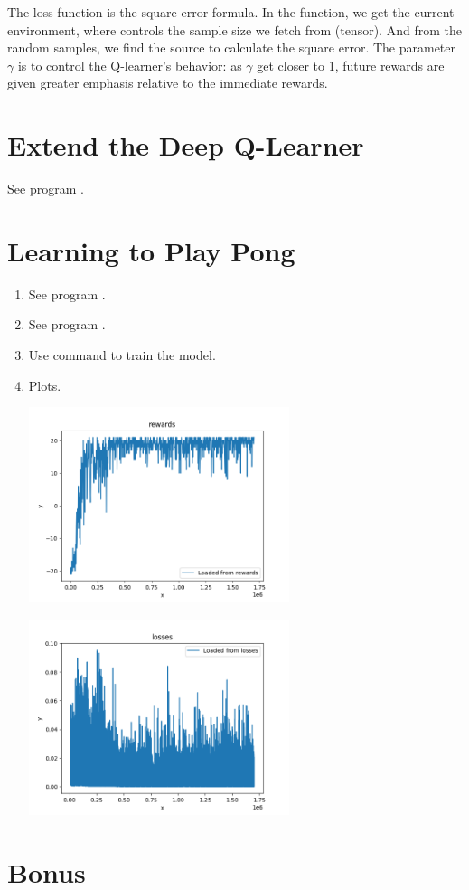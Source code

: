 \documentclass[12pt]{article}
\newcommand{\1}{\mathds{1}}
\newcommand{\<}{\langle}
\renewcommand{\>}{\rangle}
\begin{document}
The loss function is the square error formula.
In the function, we get the current environment,
where  controls the sample size we fetch from  (tensor).
And from the random samples, we find the source to calculate the square error.
The parameter $\gamma$ is to control the Q-learner's behavior:
as $\gamma$ get closer to 1,
future rewards are given greater emphasis relative to the immediate rewards.


\section{Extend the Deep Q-Learner}

See program .


\section{Learning to Play Pong}

\begin{enumerate}
    \item See program .
    \item See program .
    \item Use command  to train the model.
    \item Plots.
    \begin{center}
        \includegraphics[width=0.6\textwidth]{./rewards.png}
    \end{center}
    \begin{center}
        \includegraphics[width=0.6\textwidth]{./losses.png}
    \end{center}
\end{enumerate}


\section{Bonus}
\end{document}
